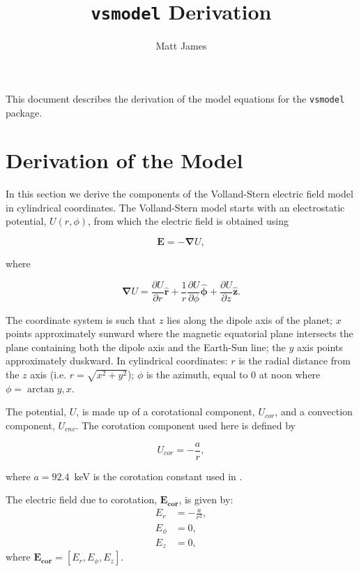 \documentclass[]{article}
\title{\texttt{vsmodel} Derivation}
\author{Matt James}
\begin{document}
\maketitle

This document describes the derivation of the model equations for the \texttt{vsmodel} package.

\section{Derivation of the Model}

In this section we derive the components of the Volland-Stern electric field model \citep{Volland1973,Stern1975} in cylindrical coordinates. The Volland-Stern model starts with an electrostatic potential, $U(r,\phi)$, from which the electric field is obtained using

\begin{equation}
	\mathbf{E} = - \mathbf{\nabla} U, \label{EqEField}
\end{equation} 

where

\begin{equation}
	\mathbf{\nabla} U = \frac{\partial U}{\partial r} \mathbf{\hat{r}} + \frac{1}{r} \frac{\partial U}{\partial \phi} \mathbf{\hat{\phi}} + \frac{\partial U}{\partial z}\mathbf{\hat{z}}. \label{EqDelU}
\end{equation}

The coordinate system is such that $z$ lies along the dipole axis of the planet; $x$ points approximately sunward where the magnetic equatorial plane intersects the plane containing both the dipole axis and the Earth-Sun line; the $y$ axis points approximately duskward. In cylindrical coordinates: $r$ is the radial distance from the $z$ axis (i.e. $r = \sqrt{x^2 + y^2}$); $\phi$ is the azimuth, equal to 0 at noon where $\phi = \arctan{y,x}$.

The potential, $U$, is made up of a corotational component, $U_{cor}$, and a convection component, $U_{cnv}$. The corotation component used here is defined by

\begin{equation}
	U_{cor} = -\frac{a}{r},
\end{equation}

where $a=92.4$~keV is the corotation constant used in \citet{Zhao2017}.

The electric field due to corotation, $\mathbf{E_{cor}}$, is given by:
\begin{align}
	E_r &= -\frac{a}{r^2}, \\
	E_\phi &= 0,\\
	E_z &= 0,
\end{align}
where $\mathbf{E_{cor}} = [E_r,E_\phi,E_z]$.
\end{document}
